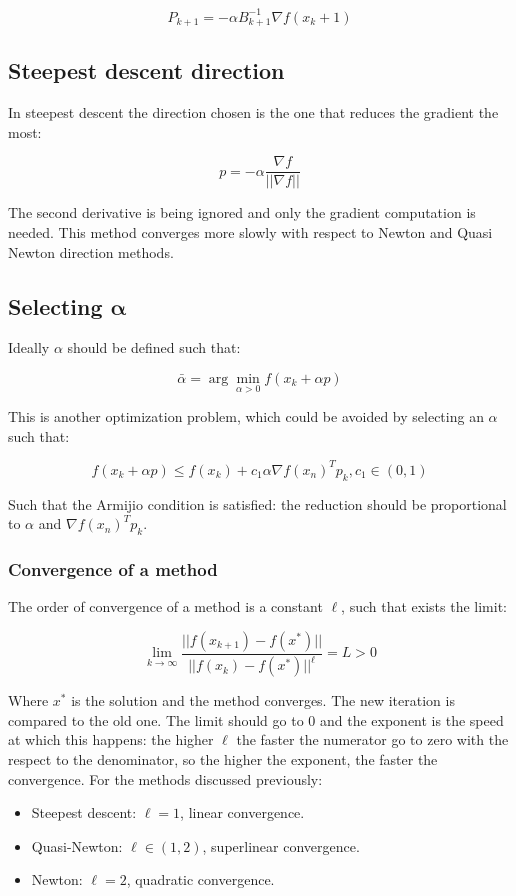   $$P_{k+1}=- \alpha B_{k+1}^{-1} \nabla f(x_k+1)$$


  \subsection{Steepest descent direction}
  In steepest descent the direction chosen is the one that reduces the gradient the most:

  $$p= -\alpha \frac{\nabla f}{||\nabla f||}$$

  The second derivative is being ignored and only the gradient computation is needed.
  This method converges more slowly with respect to Newton and Quasi Newton direction methods.

  \subsection{Selecting $\mathbf{\alpha}$}
  Ideally $\alpha$ should be defined such that:

  $$\bar{\alpha}= \arg \min_{\alpha>0} f(x_k+\alpha p)$$

  This is another optimization problem, which could be avoided by selecting an $\alpha$ such that:

  $$f(x_k+\alpha p) \leq f(x_k) + c_1\alpha \nabla f(x_n)^T p_k, c_1 \in (0,1)$$

  Such that the Armijio condition is satisfied: the reduction should be proportional to $\alpha$ and $\nabla f(x_n)^T p_k$.

  \subsubsection{Convergence of a method}
  The order of convergence of a method is a constant $\ell$, such that exists the limit:

  $$\lim_{k \rightarrow \infty  }\frac{||f(x_{k+1})-f(x^*)||}{||f(x_{k})-f(x^*)||^\ell} = L >0$$

  Where $x^*$ is the solution and the method converges.
  The new iteration is compared to the old one.
  The limit should go to $0$ and the exponent is the speed at which this happens: the higher $\ell$ the faster the numerator go to zero with the respect to the denominator, so the higher the exponent, the faster the convergence.
  For the methods discussed previously:

  \begin{multicols}{2}
    \begin{itemize}
      \item Steepest descent: $\ell=1$, linear convergence.
      \item Quasi-Newton: $\ell \in (1,2)$, superlinear convergence.
      \item Newton: $\ell=2$, quadratic convergence.
    \end{itemize}
  \end{multicols}


